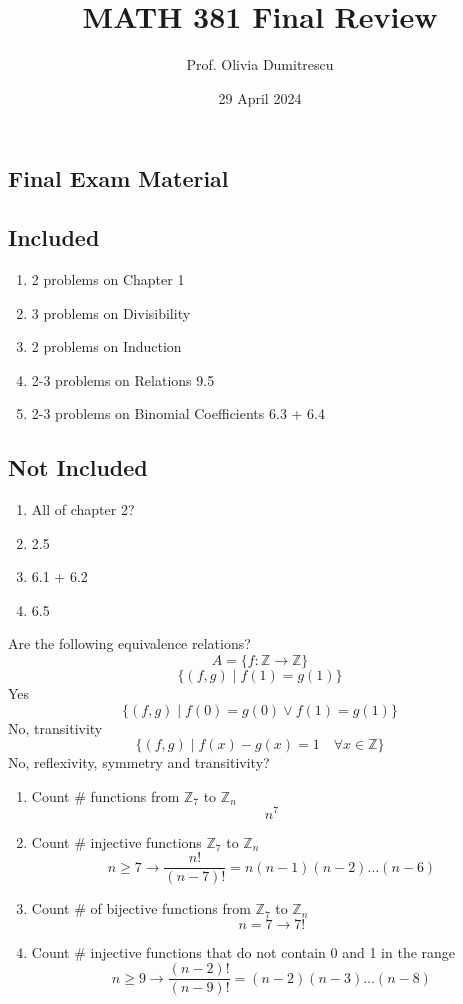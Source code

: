 \documentclass[letterpaper, 12pt]{article}
\title{MATH 381 Final Review}
\author{Prof. Olivia Dumitrescu}
\date{29 April 2024}
\newenvironment{example}[1][Example]{\begin{trivlist}
\item[\hskip \labelsep {\bfseries #1}]}{\end{trivlist}}
\newcommand{\then}{\rightarrow}
\newcommand{\Z}{\mathbb{Z}}
\newcommand{\0}{\emptyset}
\begin{document}
    \maketitle
    \subsection*{Final Exam Material}
    \subsection*{Included}
    \begin{enumerate}
        \item 2 problems on Chapter 1
        \item 3 problems on Divisibility
        \item 2 problems on Induction
        \item 2-3 problems on Relations 9.5
        \item 2-3 problems on Binomial Coefficients 6.3 + 6.4
    \end{enumerate}
    \subsection*{Not Included}
    \begin{enumerate}
        \item All of chapter 2?
        \item 2.5
        \item 6.1 + 6.2
        \item 6.5
    \end{enumerate}
    \pagebreak
    \begin{example}
        Are the following equivalence relations?
        \[A = \{f: \Z \to \Z\}\]
        \[\{(f, g) \mid f(1) = g(1)\}\]
        Yes
        \[\{(f, g) \mid f(0) = g(0) \vee f(1) = g(1)\}\]
        No, transitivity
        \[\{(f, g) \mid f(x) - g(x) = 1 \quad \forall x \in \Z\}\]
        No, reflexivity, symmetry and transitivity?
    \end{example}
    \begin{example}
        \hfill
        \begin{enumerate}
            \item Count \# functions from $\Z_7$ to $\Z_n$
            \[n^7\]
            \item Count \# injective functions $\Z_7$ to $\Z_n$
            \[n \ge 7 \then \frac{n!}{(n-7)!} = n(n-1)(n-2)\dots(n-6)\]
            \item Count \# of bijective functions from $\Z_7$ to $\Z_n$
            \[n = 7 \then 7!\]
            \item Count \# injective functions that do not contain 0 and 1 in the range
            \[n \ge 9 \then \frac{(n-2)!}{(n-9)!} = (n-2)(n-3)\dots(n-8)\]
        \end{enumerate}
    \end{example}
\end{document}
